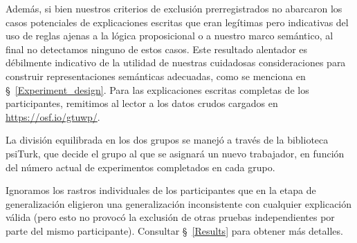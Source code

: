 Además, si bien nuestros criterios de exclusión prerregistrados no abarcaron los casos potenciales de explicaciones escritas que eran legítimas pero indicativas del uso de reglas ajenas a la lógica proposicional o a nuestro marco semántico, al final no detectamos ninguno de estos casos. Este resultado alentador es débilmente indicativo de la utilidad de nuestras cuidadosas consideraciones para construir representaciones semánticas adecuadas, como se menciona en \S~\ref{Experiment_design}. Para las explicaciones escritas completas de los participantes, remitimos al lector a los datos crudos cargados en \url{https://osf.io/gtuwp/}.

La división equilibrada en los dos grupos se manejó a través de la biblioteca psiTurk, que decide el grupo al que se asignará un nuevo trabajador, en función del número actual de experimentos completados en cada grupo.

Ignoramos los rastros individuales de los participantes que en la etapa de generalización eligieron una generalización inconsistente con cualquier explicación válida (pero esto no provocó la exclusión de otras pruebas independientes por parte del mismo participante). Consultar \S~\ref{Results} para obtener más detalles.

